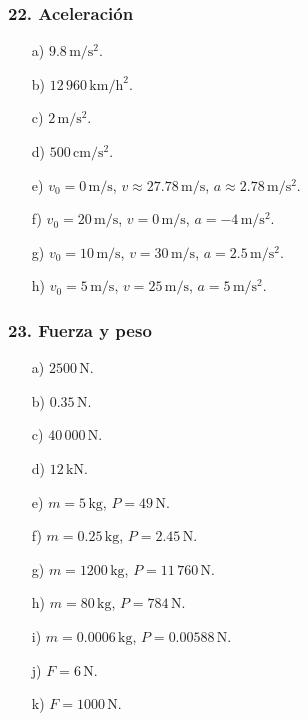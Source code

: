 \subsubsection*{22. Aceleración}
\begin{enumerate}
    \item[a)] $9.8\,\mathrm{m/s^2}$.
    \item[b)] $12\,960\,\mathrm{km/h^2}$.
    \item[c)] $2\,\mathrm{m/s^2}$.
    \item[d)] $500\,\mathrm{cm/s^2}$.
    \item[e)] $v_0=0\,\mathrm{m/s}$,
    $v\approx27.78\,\mathrm{m/s}$,
    $a\approx2.78\,\mathrm{m/s^2}$.
    \item[f)] $v_0=20\,\mathrm{m/s}$,
    $v=0\,\mathrm{m/s}$,
    $a=-4\,\mathrm{m/s^2}$.
    \item[g)] $v_0=10\,\mathrm{m/s}$,
    $v=30\,\mathrm{m/s}$,
    $a=2.5\,\mathrm{m/s^2}$.
    \item[h)] $v_0=5\,\mathrm{m/s}$,
    $v=25\,\mathrm{m/s}$,
    $a=5\,\mathrm{m/s^2}$.
\end{enumerate}

\subsubsection*{23. Fuerza y peso}
\begin{enumerate}
    \item[a)] $2500\,\mathrm{N}$.
    \item[b)] $0.35\,\mathrm{N}$.
    \item[c)] $40\,000\,\mathrm{N}$.
    \item[d)] $12\,\mathrm{kN}$.
    \item[e)] $m=5\,\mathrm{kg}$, $P=49\,\mathrm{N}$.
    \item[f)] $m=0.25\,\mathrm{kg}$, $P=2.45\,\mathrm{N}$.
    \item[g)] $m=1200\,\mathrm{kg}$, $P=11\,760\,\mathrm{N}$.
    \item[h)] $m=80\,\mathrm{kg}$, $P=784\,\mathrm{N}$.
    \item[i)] $m=0.0006\,\mathrm{kg}$, $P=0.00588\,\mathrm{N}$.
    \item[j)] $F=6\,\mathrm{N}$.
    \item[k)] $F=1000\,\mathrm{N}$.
\end{enumerate}

